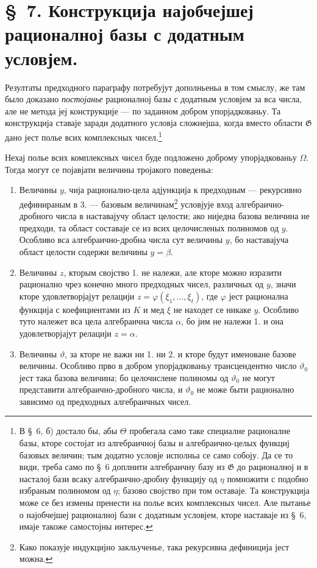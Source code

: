 ﻿\documentclass[11pt]{article}
\begin{document}
\section*{\S\ 7. Конструкција најобчејшеј рационалној базы с додатным условјем.}

Резултаты предходного параграфу потребујут дополньеньа в том смыслу, же там
было доказано {\itshape постојанье} рационалној базы с додатным условјем за вса
числа, але не метода јеј конструкције --- по заданном добром упорјадкованьу. Та
конструкција ставаје заради додатного условја сложнејша, когда вместо области
$\mathfrak G$ дано јест полье всих комплексных чисел.\footnote{В \S\ 6, б)
достало бы, абы $\Theta$ пробегала само таке специалне рационалне базы, кторе
состојат из алгебраичној базы и алгебраично-целых функциј базовых величин;
тым додатно условје исполньа се само собоју. Да се то види, треба само по
\S\ 6 доплнити алгебраичну базу из $\mathfrak G$ до рационалној и в насталој
бази всаку алгебраично-дробну функцију од $\eta$ помножити с подобно избраным
полиномом од $\eta$; базово својство при том оставаје. Та конструкција може се
без измены пренести на полье всих комплексных чисел. Але пытанье о
најобчејшеј рационалној бази с додатным условјем, кторе наставаје из \S\ 6,
имаје такоже самостојны интерес.}

Нехај полье всих комплексных чисел буде подложено доброму упорјадкованьу
$\Omega$. Тогда могут се појавјати величины тројакого поведеньа:
\begin{enumerate}
\item[1.] Величины $y$, чија рационално-цела адјункција к предходным ---
рекурсивно дефинираным в 3. --- базовым величинам\footnote{Како показује
индукцијно закльученье, така рекурсивна дефиниција јест можна.} условјује
вход алгебраично-дробного числа в наставајучу област целости; ако ниједна
базова величина не предходи, та област составаје се из всих целочисленых
полиномов од $y$. Особливо вса алгебраично-дробна числа сут величины $y$, бо
наставајуча област целости содержи величины $y=\beta$.
\item[2.] Величины $z$, кторым својство 1. не належи, але кторе можно изразити
рационално чрез конечно много предходных чисел, различных од $y$, значи кторе
удовлетворјајут релацији
$z=\varphi(\xi_1,\ldots,\xi_t)$, где $\varphi$ јест рационална функција с
коефициентами из $K$ и мед $\xi$ не находет се никаке $y$. Особливо туто
належет вса цела алгебраична числа $\alpha$, бо јим не належи 1. и она
удовлетворјајут релацији $z=\alpha$.
\item[3.] Величины $\vartheta$, за кторе не важи ни 1. ни 2. и кторе будут
именоване базове величины. Особливо прво в добром упорјадкованьу трансцендентно
число $\vartheta_0$ јест така базова величина; бо целочислене полиномы од
$\vartheta_0$ не могут представити алгебраично-дробного числа, и
$\vartheta_0$ не може быти рационално зависимо од предходных алгебраичных чисел.
\end{enumerate}
\end{document}
